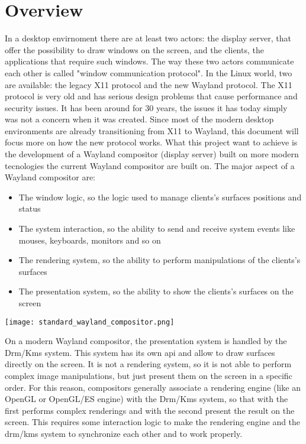 
\chapter{Overview}
In a desktop envirnoment there are at least two actors: the display server, that offer the possibility to draw windows on the screen, and the clients, the applications that require such windows. 
The way these two actors communicate each other is called "window communication protocol". 
In the Linux world, two are available: the legacy X11 protocol and the new Wayland protocol. 
The X11 protocol is very old and has serious design problems that cause performance and security issues. 
It has been around for 30 years, the issues it has today simply was not a concern when it was created. 
Since most of the modern desktop environments are already transitioning from X11 to Wayland, this document will focus more on how the new protocol works. 
What this project want to achieve is the development of a Wayland compositor (display server) built on more modern tecnologies the current Wayland compositor are built on. The major aspect of a Wayland compositor are:
\begin{itemize}
	\item The window logic, so the logic used to manage clients's surfaces positions and status
	\item The system interaction, so the ability to send and receive system events like mouses, keyboards, monitors and so on
	\item The rendering system, so the ability to perform manipulations of the clients's surfaces
	\item The presentation system, so the ability to show the clients's surfaces on the screen
\end{itemize}
\newpage
\begin{center}
	\texttt{[image: standard\_wayland\_compositor.png]}
\end{center}
On a modern Wayland compositor, the presentation system is handled by the Drm/Kms system. This system has its own api and allow to draw surfaces directly on the screen. It is not a rendering system, so it is not able to perform complex image manipulations, but just present them on the screen in a specific order. For this reason, compositors generally associate a rendering engine (like an OpenGL or OpenGL/ES engine) with the Drm/Kms system, so that with the first performs complex renderings and with the second present the result on the screen. This requires some interaction logic to make the rendering engine and the drm/kms system to synchronize each other and to work properly.\newline
